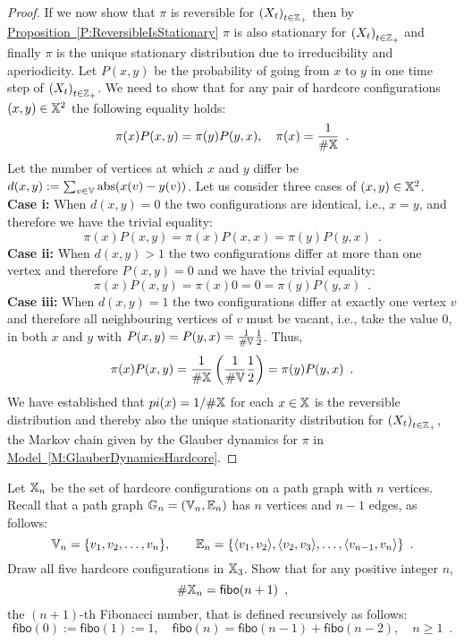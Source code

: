 \begin{prop}
\begin{proof}
If we now show that $\pi$ is reversible for $\left( X_t \right)_{t \in \mathbb{Z}_+}$ then by \hyperref[P:ReversibleIsStationary]{Proposition~\ref*{P:ReversibleIsStationary}} $\pi$ is also stationary for $\left( X_t \right)_{t \in \mathbb{Z}_+}$ and finally $\pi$ is the unique stationary distribution due to irreducibility and aperiodicity.  
Let $P(x,y)$ be the probability of going from $x$ to $y$ in one time step of $\left( X_t \right)_{t \in \mathbb{Z}_+}$.  
We need to show that for any pair of hardcore configurations $(x,y) \in \mathbb{X}^2$ the following equality holds:
\[
\pi(x) P(x,y) = \pi(y) P(y,x), \quad \pi(x) = \frac{1}{\#\mathbb{X}} \enspace .
\]
Let the number of vertices at which $x$ and $y$ differ be $d(x,y):= \sum_{v \in \mathbb{V}} \operatorname{abs}(x(v)-y(v))$.  
Let us consider three cases of $(x,y) \in \mathbb{X}^2$.\\  
{\bf Case i:} When $d(x,y)=0$ the two configurations are identical, i.e., $x=y$, and therefore we have the trivial equality:
\[
\pi(x) P(x,y) =\pi(x) P(x,x)= \pi(y) P(y,x) \enspace .
\]
{\bf Case ii:} When $d(x,y)>1$ the two configurations differ at more than one vertex and therefore $P(x,y)=0$ and we have the trivial equality:
\[
\pi(x) P(x,y) =\pi(x) 0 = 0 = \pi(y) P(y,x) \enspace .
\]
{\bf Case iii:} When $d(x,y)=1$ the two configurations differ at exactly one vertex $v$ and therefore all neighbouring vertices of $v$ must be vacant, i.e., take the value $0$, in both $x$ and $y$ with $P(x,y)=P(y,x)=\frac{1}{\#\mathbb{V}}\frac{1}{2}$.  Thus,
\[
\pi(x) P(x,y) = \frac{1}{\#\mathbb{X}} \left(\frac{1}{\#\mathbb{V}}\frac{1}{2} \right) = \pi(y) P(y,x) \enspace .
\] 
We have established that $pi(x) = 1/\#\mathbb{X}$ for each $x \in \mathbb{X}$ is the reversible distribution and thereby also the unique stationarity distribution for $\left( X_t \right)_{t \in \mathbb{Z}_+}$, the Markov chain given by the Glauber dynamics for $\pi$ in \hyperref[M:GlauberDynamicsHardcore]{Model~\ref*{M:GlauberDynamicsHardcore}}. 
\end{proof}
\end{prop}

\begin{exercise}
Let $\mathbb{X}_n$ be the set of hardcore configurations on a path graph with $n$ vertices.  
Recall that a path graph $\mathbb{G}_n=(\mathbb{V}_n,\mathbb{E}_n)$ has $n$ vertices and $n-1$ edges, as follows: 
\[
\mathbb{V}_n = \{v_1,v_2,\ldots,v_n \}, \qquad \mathbb{E}_n = \{ \langle v_1, v_2 \rangle, \langle v_2, v_3 \rangle, \ldots, \langle v_{n-1}, v_n \rangle \} \enspace .
\]
Draw all five hardcore configurations in $\mathbb{X}_3$.  Show that for any positive integer $n$, 
\[
\# \mathbb{X}_n = \mathsf{fibo}(n+1) \enspace ,
\]
the $(n+1)$-th Fibonacci number, that is defined recursively as follows:
\[
\mathsf{fibo}(0) := \mathsf{fibo}(1) := 1, \quad \mathsf{fibo}(n) = \mathsf{fibo}(n-1)+\mathsf{fibo}(n-2), \quad n \geq 1 \enspace .
\]
\end{exercise}


